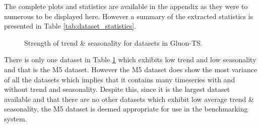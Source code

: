The complete plots and statistics are available in the appendix as they were to numerous to be displayed here. However a summary of the extracted statistics is presented in Table \ref{tab:dataset_statistics}.


\begin{figure}[h]
  \centering
  \caption{Strength of trend \& seasonality for datasets in Gluon-TS.}
  \label{heatmap_strengths}
\end{figure}
There is only one dataset in Table \ref{heatmap_strengths} which exhibits low trend and low seasonality and that is the M5 dataset. However the M5 dataset does show the most variance of all the datasets which implies that it contains many timeseries with and without trend and seasonality. Despite this, since it is the largest dataset available and that there are no other datasets which exhibit low average trend \& seasonality, the M5 dataset is deemed appropriate for use in the benchmarking system.

